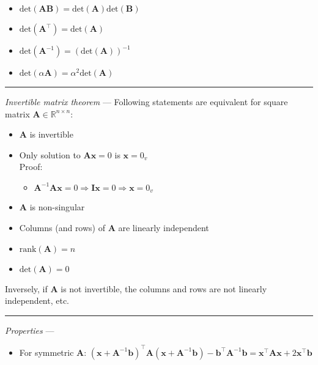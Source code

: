 \begin{itemize}
\begin{itemize}
\begin{multicols}{2}
\begin{itemize}
            \item $\textrm{det}(\boldsymbol{A}\boldsymbol{B}) = \textrm{det}(\boldsymbol{A})\textrm{det}(\boldsymbol{B})$
            \item $\textrm{det}(\boldsymbol{A}^\intercal) = \textrm{det}(\boldsymbol{A})$
            \item $\textrm{det}(\boldsymbol{A}^{-1}) = (\textrm{det}(\boldsymbol{A}))^{-1}$
            \item $\textrm{det}(\alpha\boldsymbol{A}) = \alpha^2\textrm{det}(\boldsymbol{A})$
        \end{itemize}
        \end{multicols}
    \end{itemize}
    
\end{itemize}

{\color{lightgray}\hrule height 0.001mm}

\emph{Invertible matrix theorem} --- Following statements are equivalent for square matrix $\boldsymbol{A} \in \mathbb{R}^{n \times n}$: 
\begin{itemize}
    \item $\boldsymbol{A}$ is invertible
    \item Only solution to $\boldsymbol{A}\boldsymbol{x} = 0$ is $\boldsymbol{x} = 0_v$\\
    Proof:
    \begin{itemize}
        \item $\boldsymbol{A}^{-1} \boldsymbol{A} \boldsymbol{x} = 0 \Rightarrow \boldsymbol{I} \boldsymbol{x} = 0 \Rightarrow \boldsymbol{x} = 0_v$
    \end{itemize}
    \item $\boldsymbol{A}$ is non-singular
    \item Columns (and rows) of $\boldsymbol{A}$ are linearly independent
    \item $\textrm{rank}(\boldsymbol{A}) = n$
    \item $\textrm{det}(\boldsymbol{A}) = 0$
\end{itemize}
Inversely, if $\boldsymbol{A}$ is not invertible, the columns and rows are not linearly independent, etc. 

{\color{lightgray}\hrule height 0.001mm}

\emph{Properties} --- 
\begin{itemize}
    \item For symmetric $\boldsymbol{A}$: $( \boldsymbol{x} + \boldsymbol{A}^{-1} \boldsymbol{b} )^\intercal \boldsymbol{A} ( \boldsymbol{x} + \boldsymbol{A}^{-1} \boldsymbol{b} ) - \boldsymbol{b}^\intercal \boldsymbol{A}^{-1} \boldsymbol{b} = \boldsymbol{x}^\intercal \boldsymbol{A} \boldsymbol{x} + 2 \boldsymbol{x}^\intercal \boldsymbol{b}$
\end{itemize}

